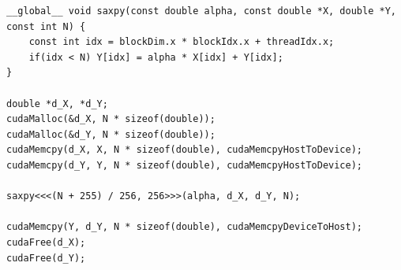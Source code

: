 \begin{listing}
    \begin{verbatim}
__global__ void saxpy(const double alpha, const double *X, double *Y, const int N) {
    const int idx = blockDim.x * blockIdx.x + threadIdx.x;
    if(idx < N) Y[idx] = alpha * X[idx] + Y[idx];
}
    
double *d_X, *d_Y;
cudaMalloc(&d_X, N * sizeof(double));
cudaMalloc(&d_Y, N * sizeof(double));
cudaMemcpy(d_X, X, N * sizeof(double), cudaMemcpyHostToDevice);
cudaMemcpy(d_Y, Y, N * sizeof(double), cudaMemcpyHostToDevice);

saxpy<<<(N + 255) / 256, 256>>>(alpha, d_X, d_Y, N);

cudaMemcpy(Y, d_Y, N * sizeof(double), cudaMemcpyDeviceToHost);
cudaFree(d_X);
cudaFree(d_Y);
    \end{verbatim}
    \caption{%
}
\end{listing}
